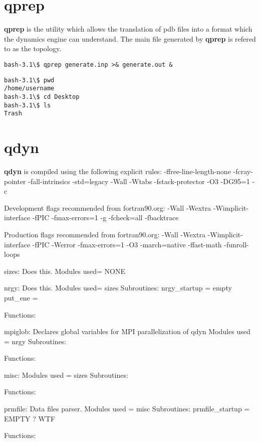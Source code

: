 \documentclass[10pt, oneside, pdftex]{article}
\begin{document}
\label{qprep}
\section{qprep}
\textbf{qprep} is the utility which allows the translation of pdb files into
a format which the dynamics engine can understand. The main file generated
by \textbf{qprep} is refered to as the topology.

\lstset{language=sh, frame=single}
\begin{Verbatim}
bash-3.1\$ qprep generate.inp >& generate.out &
\end{Verbatim}


\begin{Verbatim}
bash-3.1\$ pwd
/home/username
bash-3.1\$ cd Desktop
bash-3.1\$ ls
Trash
\end{Verbatim}


\section{qdyn}
\textbf{qdyn} is compiled using the following explicit rules:
-ffree-line-length-none
-fcray-pointer
-fall-intrinsics 
-std=legacy 
-Wall 
-Wtabs 
-fstack-protector 
-O3 
-DG95=1 -c 

Development flags recommended from fortran90.org:
-Wall -Wextra -Wimplicit-interface -fPIC -fmax-errors=1 -g -fcheck=all -fbacktrace

Production flags recommended from fortran90.org:
-Wall -Wextra -Wimplicit-interface -fPIC -Werror -fmax-errors=1 -O3 -march=native -ffast-math -funroll-loops


sizes: Does this.
Modules used= NONE


nrgy: Does this.
Modules used= sizes
Subroutines: 
  nrgy\_startup = empty
  put\_ene = 

Functions:


mpiglob: Declares global variables for MPI parallelization of qdyn
Modules used = nrgy
Subroutines:

Functions:


misc:
Modules used = sizes
Subroutines:

Functions:


prmfile: Data files parser.
Modules used = misc
Subroutines: 
  prmfile\_startup = EMPTY ? WTF


Functions:
\end{document}
